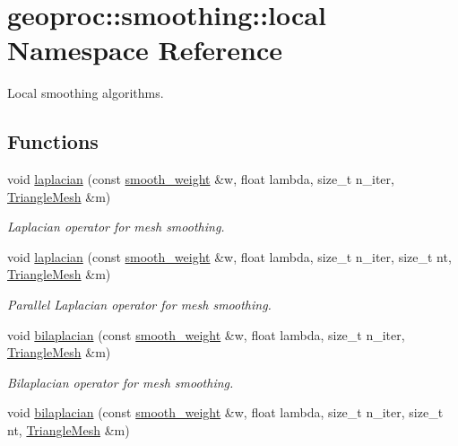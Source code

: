 \hypertarget{namespacegeoproc_1_1smoothing_1_1local}{}\section{geoproc\+:\+:smoothing\+:\+:local Namespace Reference}
\label{namespacegeoproc_1_1smoothing_1_1local}


Local smoothing algorithms.  


\subsection*{Functions}
\begin{DoxyCompactItemize}
\item 
void \hyperlink{namespacegeoproc_1_1smoothing_1_1local_a3eaa81a7fe893e316190a0ab9598732c}{laplacian} (const \hyperlink{namespacegeoproc_1_1smoothing_a76e43f405426c150569712512de58028}{smooth\+\_\+weight} \&w, float lambda, size\+\_\+t n\+\_\+iter, \hyperlink{classgeoproc_1_1TriangleMesh}{Triangle\+Mesh} \&m)
\begin{DoxyCompactList}\small\item\em Laplacian operator for mesh smoothing. \end{DoxyCompactList}\item 
void \hyperlink{namespacegeoproc_1_1smoothing_1_1local_a160f3ee32c5073d99e3f38782bd4a070}{laplacian} (const \hyperlink{namespacegeoproc_1_1smoothing_a76e43f405426c150569712512de58028}{smooth\+\_\+weight} \&w, float lambda, size\+\_\+t n\+\_\+iter, size\+\_\+t nt, \hyperlink{classgeoproc_1_1TriangleMesh}{Triangle\+Mesh} \&m)
\begin{DoxyCompactList}\small\item\em Parallel Laplacian operator for mesh smoothing. \end{DoxyCompactList}\item 
void \hyperlink{namespacegeoproc_1_1smoothing_1_1local_a5958a9bdf688836bd6242de213a68ec4}{bilaplacian} (const \hyperlink{namespacegeoproc_1_1smoothing_a76e43f405426c150569712512de58028}{smooth\+\_\+weight} \&w, float lambda, size\+\_\+t n\+\_\+iter, \hyperlink{classgeoproc_1_1TriangleMesh}{Triangle\+Mesh} \&m)
\begin{DoxyCompactList}\small\item\em Bilaplacian operator for mesh smoothing. \end{DoxyCompactList}\item 
void \hyperlink{namespacegeoproc_1_1smoothing_1_1local_a7c96dc664c1900b1cba6d3a3eb2547d7}{bilaplacian} (const \hyperlink{namespacegeoproc_1_1smoothing_a76e43f405426c150569712512de58028}{smooth\+\_\+weight} \&w, float lambda, size\+\_\+t n\+\_\+iter, size\+\_\+t nt, \hyperlink{classgeoproc_1_1TriangleMesh}{Triangle\+Mesh} \&m)

\end{DoxyCompactItemize}
